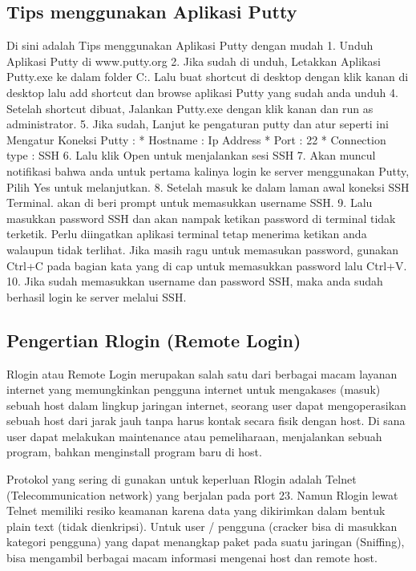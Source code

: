\subsection {Tips menggunakan Aplikasi Putty}
Di sini adalah Tips menggunakan Aplikasi Putty dengan mudah
1. Unduh Aplikasi Putty di www.putty.org
2. Jika sudah di unduh, Letakkan Aplikasi Putty.exe ke dalam folder C:. Lalu buat shortcut di desktop dengan klik kanan di desktop lalu add shortcut dan browse aplikasi Putty yang sudah anda unduh
4. Setelah shortcut dibuat, Jalankan Putty.exe dengan klik kanan dan run as administrator.
5. Jika sudah, Lanjut ke pengaturan putty dan atur seperti ini
Mengatur Koneksi Putty :
* Hostname 			: Ip Address
* Port 				: 22
* Connection type 	: SSH
6. Lalu klik Open untuk menjalankan sesi SSH
7. Akan muncul notifikasi bahwa anda untuk pertama kalinya login ke server menggunakan Putty, Pilih Yes untuk melanjutkan.
8. Setelah masuk ke dalam laman awal koneksi SSH Terminal. akan di beri prompt untuk memasukkan username SSH.
9. Lalu masukkan password SSH dan akan nampak ketikan password di terminal tidak terketik. Perlu diingatkan aplikasi terminal tetap menerima ketikan anda walaupun tidak terlihat. Jika masih ragu untuk memasukan password, gunakan Ctrl+C pada bagian kata yang di cap untuk memasukkan password lalu Ctrl+V.
10. Jika sudah memasukkan username dan password SSH, maka anda sudah berhasil login ke server melalui SSH.
 
\subsection {Pengertian Rlogin (Remote Login)}

Rlogin atau Remote Login merupakan salah satu dari berbagai macam layanan internet yang memungkinkan pengguna internet untuk mengakases (masuk)  sebuah host dalam lingkup jaringan internet, seorang user dapat mengoperasikan sebuah host dari jarak jauh tanpa harus kontak secara fisik dengan host. Di sana user dapat melakukan maintenance atau pemeliharaan, menjalankan sebuah program, bahkan menginstall program baru di host.

Protokol yang sering di gunakan untuk keperluan Rlogin adalah Telnet (Telecommunication network) yang berjalan pada port 23. Namun Rlogin lewat Telnet memiliki resiko keamanan karena data yang dikirimkan dalam bentuk plain text (tidak dienkripsi). Untuk user / pengguna (cracker bisa di masukkan kategori pengguna) yang dapat menangkap paket pada suatu jaringan (Sniffing), bisa mengambil berbagai macam informasi mengenai host dan remote host.


